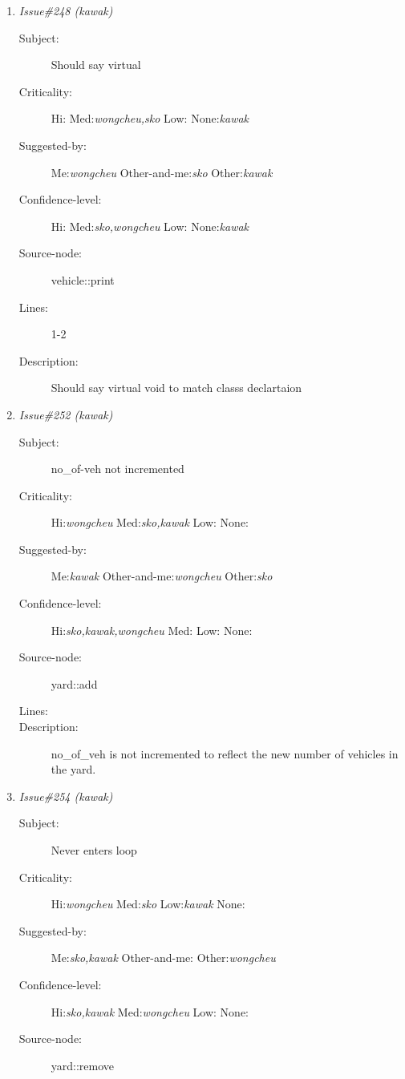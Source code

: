\begin{enumerate}
\begin{description}
\item [Description:] Kevin- I think that this destructor shouldn't do anything.  If there are
vehicles in this yard, they should be destroyed bny their own destructor when
they go out of scope.  If a vehicle is referenced by more than one yard and
it is destroyerd when one of the yards go out of scope, then there wmight be
a problem when another yard tries to access a vehicle.
\end{description}
\item {\it Issue\#248 (kawak)}
\begin{description}
\item [Subject:] Should say virtual
\item [Criticality:] Hi:{\it } Med:{\it wongcheu,sko} Low:{\it } None:{\it kawak}
\item [Suggested-by:] Me:{\it wongcheu} Other-and-me:{\it sko} Other:{\it kawak}
\item [Confidence-level:] Hi:{\it } Med:{\it sko,wongcheu} Low:{\it } None:{\it kawak}
\item [Source-node:] vehicle::print

\item [Lines:] 1-2

\item [Description:] Should say virtual void to match classs declartaion
\end{description}
\item {\it Issue\#252 (kawak)}
\begin{description}
\item [Subject:] no\_of-veh not incremented
\item [Criticality:] Hi:{\it wongcheu} Med:{\it sko,kawak} Low:{\it } None:{\it }
\item [Suggested-by:] Me:{\it kawak} Other-and-me:{\it wongcheu} Other:{\it sko}
\item [Confidence-level:] Hi:{\it sko,kawak,wongcheu} Med:{\it } Low:{\it } None:{\it }
\item [Source-node:] yard::add

\item [Lines:] 

\item [Description:] no\_of\_veh is not incremented to reflect the new number of vehicles in the
yard.
\end{description}
\item {\it Issue\#254 (kawak)}
\begin{description}
\item [Subject:] Never enters loop
\item [Criticality:] Hi:{\it wongcheu} Med:{\it sko} Low:{\it kawak} None:{\it }
\item [Suggested-by:] Me:{\it sko,kawak} Other-and-me:{\it } Other:{\it wongcheu}
\item [Confidence-level:] Hi:{\it sko,kawak} Med:{\it wongcheu} Low:{\it } None:{\it }
\item [Source-node:] yard::remove


\end{description}
\end{enumerate}
